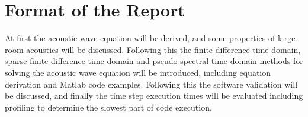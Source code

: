 \section{Format of the Report}
At first the acoustic wave equation will be derived, and some properties of large room acoustics will be discussed. Following this the finite difference time domain, sparse finite difference time domain and pseudo spectral time domain methods for solving the acoustic wave equation will be introduced, including equation derivation and Matlab code examples. Following this the software validation will be discussed, and finally the time step execution times will be evaluated including profiling to determine the slowest part of code execution.\\

